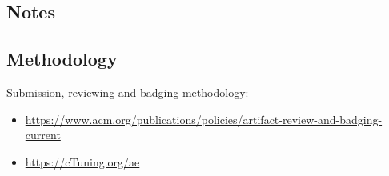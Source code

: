 \documentclass{sigplanconf}
\begin{document}
\subsection{Notes}
\label{subsec:artifact-notes}

\subsection{Methodology}
\label{subsec:artifact-meth}

Submission, reviewing and badging methodology:

\begin{itemize}
  \item \url{https://www.acm.org/publications/policies/artifact-review-and-badging-current}
  \item \url{https://cTuning.org/ae}
\end{itemize}

\end{document}

